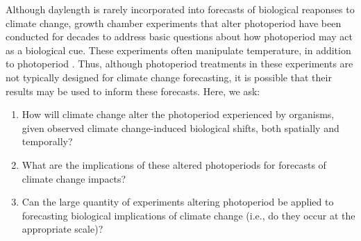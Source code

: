 \documentclass{article}
\begin{document}
\par Although daylength is rarely incorporated into forecasts of biological reaponses to climate change, growth chamber experiments that alter photoperiod have been conducted for decades to address basic questions about how photoperiod may act as a biological cue. These experiments often manipulate temperature, in addition to photoperiod \citep[e.g.,][]{Campbell:1975aa,HEIDE:1977aa,Falusi:1990aa,Spann:2004aa,Laube:2014a}. Thus, although photoperiod treatments in these experiments are not typically designed for climate change forecasting, it is possible that their results may be used to inform these forecasts. 
Here, we ask: 
\begin{enumerate}
\item How will climate change alter the photoperiod experienced by organisms, given observed climate change-induced biological shifts, both spatially and temporally?
\item What are the implications of these altered photoperiods for forecasts of climate change impacts?
\item Can the large quantity of experiments altering photoperiod be applied to forecasting biological implications of climate change (i.e., do they occur at the appropriate scale)?
\end{enumerate}
\end{document}
